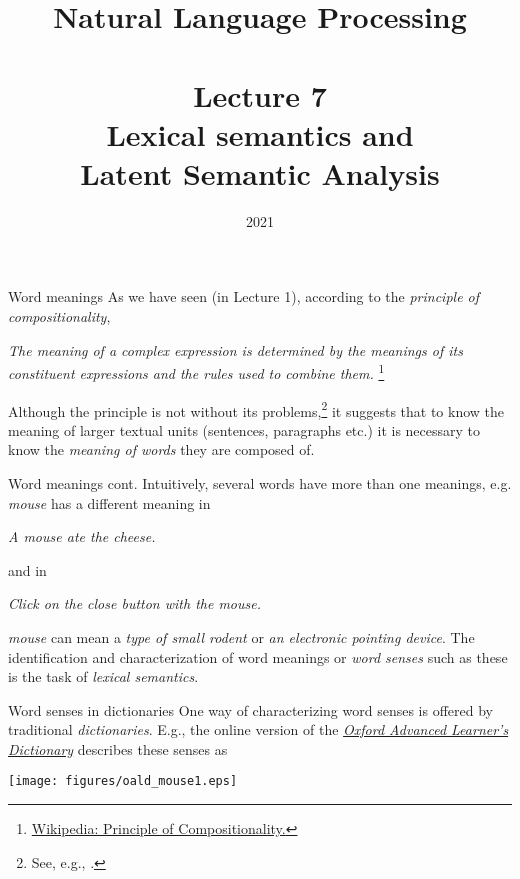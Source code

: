 \documentclass[style=upen, size=14pt]{powerdot}
\newcommand{\gold}{\color{arany}}
\theoremstyle{definition}
\begin{document}
\title{Natural Language Processing\\~~\\Lecture 7\\Lexical semantics and\\ Latent
  Semantic Analysis}

\date{2021}
\maketitle

\begin{slide}{Word meanings}
  As we have seen (in Lecture 1), according to the \emph{\gold principle of
    compositionality},\medskip
  
  \emph{The meaning of a complex expression is determined by the meanings of its
    constituent expressions and the rules used to combine them.}
  \footnote{\href{https://en.wikipedia.org/wiki/Principle_of_compositionality}{Wikipedia:
      Principle of Compositionality.}}\medskip

  Although the principle is not without its problems,\footnote{See, e.g.,
    \cite{sep-compositionality}.} it suggests that to know the meaning of larger
  textual units (sentences, paragraphs etc.) it is necessary to know the
  \emph{\gold meaning of words} they are composed of.
\end{slide}

\begin{slide}[toc=]{Word meanings cont.}
  Intuitively, several words have more than one meanings, e.g. \emph{mouse} has
  a different meaning in\bigskip

  \emph{A {\gold mouse} ate the cheese.}\medskip
  
  and in\medskip

  \emph{Click on the close button with the {\gold mouse}.}\bigskip

  \emph{mouse} can mean a \emph{type of small rodent} or \emph{an electronic
    pointing device}. The identification and characterization of word meanings
  or \emph{\gold word senses} such as these is the task of \emph{\gold lexical
    semantics}.
\end{slide}


\begin{slide}[toc=Dictionaries]{Word senses in dictionaries}
  One way of characterizing word senses is offered by traditional \textit{\gold
    dictionaries}. E.g., the online version of the
  \href{https://www.oxfordlearnersdictionaries.com/definition/english/mouse_1?q=mouse}{\emph{Oxford
      Advanced Learner's Dictionary}} describes these senses as\bigskip
  
  \begin{centering}
    
    \texttt{[image: figures/oald\_mouse1.eps]}
    
  \end{centering}
\end{slide}
\end{document}

